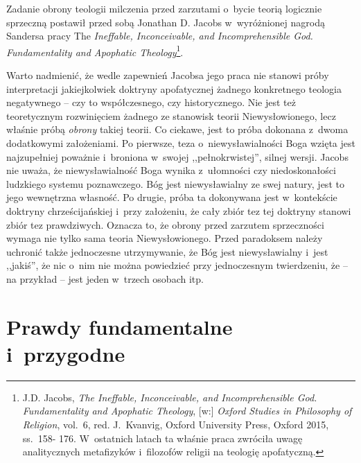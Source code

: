 Zadanie obrony teologii milczenia przed zarzutami o~bycie teorią logicznie sprzeczną postawił przed sobą Jonathan D. Jacobs w~wyróżnionej nagrodą Sandersa pracy The \textit{Ineffable, Inconceivable, and Incomprehensible God. Fundamentality and Apophatic Theology}\footnote{J.D. Jacobs, \textit{The Ineffable, Inconceivable, and Incomprehensible God. Fundamentality and Apophatic Theology}, [w:] \textit{Oxford Studies in Philosophy of Religion}, vol.~6, red. J.~Kvanvig, Oxford University Press, Oxford 2015, ss.~158- 176. W~ostatnich latach ta właśnie praca zwróciła uwagę analitycznych metafizyków i~filozofów religii na teologię apofatyczną.}.

Warto nadmienić, że wedle zapewnień Jacobsa jego praca nie stanowi próby interpretacji jakiejkolwiek doktryny apofatycznej żadnego konkretnego teologia negatywnego -- czy to współczesnego, czy historycznego. Nie jest też teoretycznym rozwinięciem żadnego ze stanowisk teorii Niewysłowionego, lecz właśnie próbą \textit{obrony} takiej teorii. Co ciekawe, jest to próba dokonana z~dwoma dodatkowymi założeniami. Po pierwsze, teza o~niewysławialności Boga wzięta jest najzupełniej poważnie i~broniona w~swojej ,,pełnokrwistej'', silnej wersji. Jacobs nie uważa, że niewysławialność Boga wynika z~ułomności czy niedoskonałości ludzkiego systemu poznawczego. Bóg jest niewysławialny ze swej natury, jest to jego wewnętrzna własność. Po drugie, próba ta dokonywana jest w~kontekście doktryny chrześcijańskiej i~przy założeniu, że cały zbiór tez tej doktryny stanowi zbiór tez prawdziwych. Oznacza to, że obrony przed zarzutem sprzeczności wymaga nie tylko sama teoria Niewysłowionego. Przed paradoksem należy uchronić także jednoczesne utrzymywanie, że Bóg jest niewysławialny i~jest ,,jakiś'', że nic o~nim nie można powiedzieć przy jednoczesnym twierdzeniu, że -- na przykład -- jest jeden w~trzech osobach itp.


\section{Prawdy fundamentalne i~przygodne}

